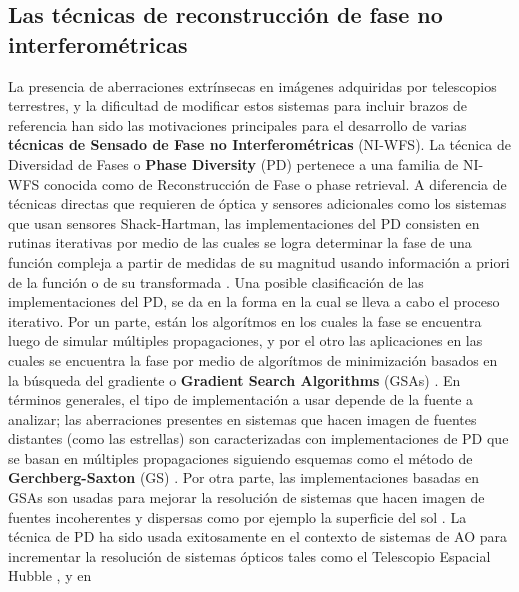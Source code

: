 \subsection{Las técnicas de reconstrucción de fase no interferométricas}
\label{sec:ChPD_estado_del_arte}
La presencia de aberraciones extrínsecas
en imágenes adquiridas por telescopios terrestres, y
la dificultad de modificar estos sistemas para incluir brazos de
referencia han sido las motivaciones principales para 
el desarrollo de varias \textbf{técnicas de Sensado de Fase no
Interferométricas} (\acrshort{NI-WFS}). La técnica de Diversidad de Fases o \textbf{Phase
Diversity} (\acrshort{PD}) pertenece a una familia de NI-WFS conocida como de
Reconstrucción de Fase o phase retrieval. A diferencia de técnicas
directas que requieren de óptica y sensores adicionales como los
sistemas que usan sensores Shack-Hartman, las implementaciones del PD
consisten en rutinas iterativas por medio de las cuales se 
logra determinar la fase de una función
compleja a partir de medidas de su magnitud usando 
información a priori de la función o de su transformada
. 
Una posible clasificación de las implementaciones del PD, se
da en la forma en la cual se lleva a cabo el proceso iterativo. Por un
parte, están los algorítmos en los cuales la fase se encuentra luego de
simular múltiples propagaciones, y por el otro las aplicaciones en las
cuales se encuentra la fase por medio de algorítmos de minimización
basados en la búsqueda del gradiente o \textbf{Gradient Search
  Algorithms} (\acrshort{GSAs}) . 
En términos generales, el tipo de implementación a usar depende de la
fuente a analizar; las aberraciones presentes en sistemas que hacen
imagen de fuentes distantes (como las estrellas) son caracterizadas
con implementaciones de PD que se basan en múltiples propagaciones
siguiendo esquemas como el método de \textbf{Gerchberg-Saxton} (\acrshort{GS})
. Por otra parte, las implementaciones basadas en GSAs son
usadas para mejorar la resolución de sistemas que hacen imagen de
fuentes incoherentes y dispersas como por ejemplo la superficie del
sol .  
La técnica de PD ha sido usada
exitosamente en el contexto de sistemas de AO para incrementar la
resolución de sistemas ópticos 
tales como el Telescopio Espacial Hubble , y en
